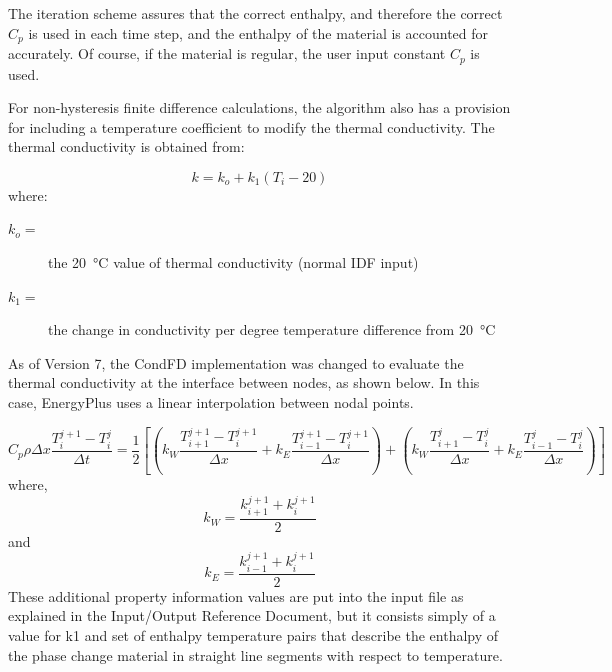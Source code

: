 The iteration scheme assures that the correct enthalpy, and therefore the
correct $C_p$ is used in each time step, and the enthalpy of the material is
accounted for accurately. Of course, if the material is regular, the user input
constant $C_p$ is used.

For non-hysteresis finite difference calculations, the algorithm also has a
provision for including a temperature coefficient to modify the thermal
conductivity. The thermal conductivity is obtained from:

\begin{equation}
k = k_o + k_1\left( T_i - 20 \right)
\end{equation}
%
where:
\begin{description}
\item[\(k_o =\)] the \SI{20}{\celsius} value of thermal conductivity (normal IDF
input)
\item[\(k_1 =\)] the change in conductivity per degree temperature difference from
\SI{20}{\celsius}
\end{description}

As of Version 7, the CondFD implementation was changed to evaluate the thermal
conductivity at the interface between nodes, as shown below. In this case,
EnergyPlus uses a linear interpolation between nodal points.

\begin{equation}
C_p\rho\Delta x\frac{T_i^{j + 1} - T_i^j}{\Delta t} =
\frac{1}{2}\left[ \left( k_W\frac{T_{i + 1}^{j + 1} - T_i^{j + 1}}{\Delta x}
                       + k_E\frac{T_{i - 1}^{j + 1} - T_i^{j + 1}}{\Delta x}
                 \right)
                + \left( k_W\frac{T_{i + 1}^j - T_i^j}{\Delta x}
                       + k_E\frac{T_{i - 1}^j - T_i^j}{\Delta x}\right)\right]
\end{equation}
%
where,
%
\begin{equation}
k_W = \frac{k_{i + 1}^{j + 1} + k_i^{j + 1}}{2}
\end{equation}
%
and
%
\begin{equation}
k_E = \frac{k_{i - 1}^{j + 1} + k_i^{j + 1}}{2}
\end{equation}
%
These additional property information values are put into the input file as
explained in the Input/Output Reference Document, but it consists simply of a
value for k1 and set of enthalpy temperature pairs that describe the enthalpy of
the phase change material in straight line segments with respect to temperature.


